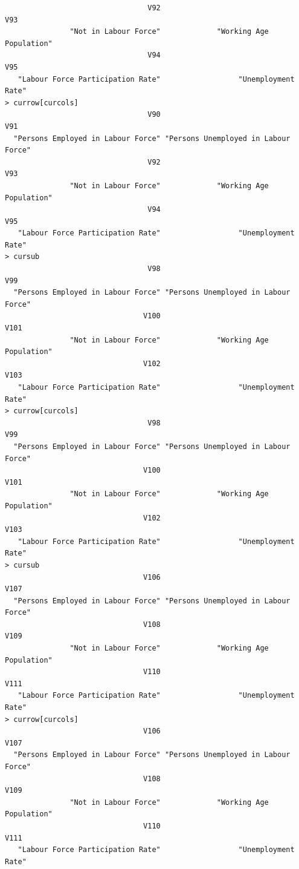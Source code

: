 \documentclass[a4paper]{article}
\begin{document}
\begin{verbatim}
                                 V92                                  V93 
               "Not in Labour Force"             "Working Age Population" 
                                 V94                                  V95 
   "Labour Force Participation Rate"                  "Unemployment Rate" 
> currow[curcols] 
                                 V90                                  V91 
  "Persons Employed in Labour Force" "Persons Unemployed in Labour Force" 
                                 V92                                  V93 
               "Not in Labour Force"             "Working Age Population" 
                                 V94                                  V95 
   "Labour Force Participation Rate"                  "Unemployment Rate" 
> cursub 
                                 V98                                  V99 
  "Persons Employed in Labour Force" "Persons Unemployed in Labour Force" 
                                V100                                 V101 
               "Not in Labour Force"             "Working Age Population" 
                                V102                                 V103 
   "Labour Force Participation Rate"                  "Unemployment Rate" 
> currow[curcols] 
                                 V98                                  V99 
  "Persons Employed in Labour Force" "Persons Unemployed in Labour Force" 
                                V100                                 V101 
               "Not in Labour Force"             "Working Age Population" 
                                V102                                 V103 
   "Labour Force Participation Rate"                  "Unemployment Rate" 
> cursub 
                                V106                                 V107 
  "Persons Employed in Labour Force" "Persons Unemployed in Labour Force" 
                                V108                                 V109 
               "Not in Labour Force"             "Working Age Population" 
                                V110                                 V111 
   "Labour Force Participation Rate"                  "Unemployment Rate" 
> currow[curcols] 
                                V106                                 V107 
  "Persons Employed in Labour Force" "Persons Unemployed in Labour Force" 
                                V108                                 V109 
               "Not in Labour Force"             "Working Age Population" 
                                V110                                 V111 
   "Labour Force Participation Rate"                  "Unemployment Rate" 

\end{verbatim}
\end{document}

